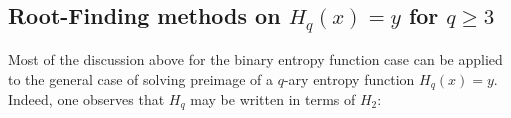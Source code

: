 \documentclass{article}
\begin{document}



\subsection{Root-Finding methods on $H_{q}(x)=y$ for $q\geq 3$}

Most of the discussion above for the binary entropy function case can be applied to the general case of solving preimage of a $q$-ary entropy function $H_{q}(x)=y$. Indeed, one observes that $H_{q}$ may be written in terms of $H_{2}$:
\end{document}
